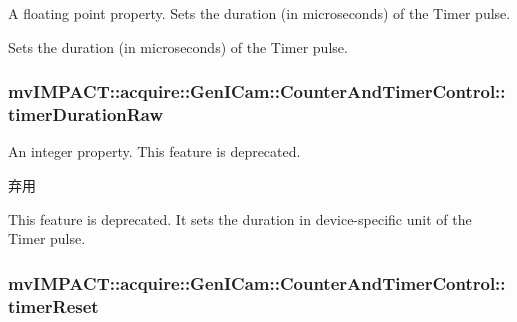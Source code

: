 A floating point property. Sets the duration (in microseconds) of the Timer pulse. 

Sets the duration (in microseconds) of the Timer pulse. \hypertarget{classmv_i_m_p_a_c_t_1_1acquire_1_1_gen_i_cam_1_1_counter_and_timer_control_ac8814d7bc9581dadc3411ceef2a4cb1e}{
\subsubsection[{timer\+Duration\+Raw}]{ mv\+I\+M\+P\+A\+C\+T\+::acquire\+::\+Gen\+I\+Cam\+::\+Counter\+And\+Timer\+Control\+::timer\+Duration\+Raw}}\label{classmv_i_m_p_a_c_t_1_1acquire_1_1_gen_i_cam_1_1_counter_and_timer_control_ac8814d7bc9581dadc3411ceef2a4cb1e}


An integer property. This feature is deprecated. 

\begin{DoxyRefDesc}{弃用}
\item[\hyperlink{deprecated__deprecated000051}{弃用}]This feature is deprecated. It sets the duration in device-\/specific unit of the Timer pulse. \end{DoxyRefDesc}
\hypertarget{classmv_i_m_p_a_c_t_1_1acquire_1_1_gen_i_cam_1_1_counter_and_timer_control_a5b4a47b49eeeb512aa34c9a9118fd378}{
\subsubsection[{timer\+Reset}]{ mv\+I\+M\+P\+A\+C\+T\+::acquire\+::\+Gen\+I\+Cam\+::\+Counter\+And\+Timer\+Control\+::timer\+Reset}}\label{classmv_i_m_p_a_c_t_1_1acquire_1_1_gen_i_cam_1_1_counter_and_timer_control_a5b4a47b49eeeb512aa34c9a9118fd378}


